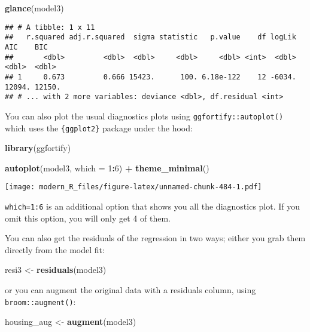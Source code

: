 \documentclass[
]{article}
\newenvironment{Shaded}{\begin{snugshade}}{\end{snugshade}}
\newcommand{\DataTypeTok}[1]{\textcolor[rgb]{0.13,0.29,0.53}{#1}}
\newcommand{\DecValTok}[1]{\textcolor[rgb]{0.00,0.00,0.81}{#1}}
\newcommand{\KeywordTok}[1]{\textcolor[rgb]{0.13,0.29,0.53}{\textbf{#1}}}
\newcommand{\NormalTok}[1]{#1}
\newcommand{\OperatorTok}[1]{\textcolor[rgb]{0.81,0.36,0.00}{\textbf{#1}}}
\newcommand{\StringTok}[1]{\textcolor[rgb]{0.31,0.60,0.02}{#1}}
\begin{document}
\begin{Shaded}
\begin{Highlighting}[]
\KeywordTok{glance}\NormalTok{(model3)}
\end{Highlighting}
\end{Shaded}

\begin{verbatim}
## # A tibble: 1 x 11
##   r.squared adj.r.squared  sigma statistic   p.value    df logLik    AIC    BIC
##       <dbl>         <dbl>  <dbl>     <dbl>     <dbl> <int>  <dbl>  <dbl>  <dbl>
## 1     0.673         0.666 15423.      100. 6.18e-122    12 -6034. 12094. 12150.
## # ... with 2 more variables: deviance <dbl>, df.residual <int>
\end{verbatim}

You can also plot the usual diagnostics plots using \texttt{ggfortify::autoplot()} which uses the
\texttt{\{ggplot2\}} package under the hood:

\begin{Shaded}
\begin{Highlighting}[]
\KeywordTok{library}\NormalTok{(ggfortify)}

\KeywordTok{autoplot}\NormalTok{(model3, }\DataTypeTok{which =} \DecValTok{1}\OperatorTok{:}\DecValTok{6}\NormalTok{) }\OperatorTok{+}\StringTok{ }\KeywordTok{theme\_minimal}\NormalTok{()}
\end{Highlighting}
\end{Shaded}

\texttt{[image: modern\_R\_files/figure-latex/unnamed-chunk-484-1.pdf]}

\texttt{which=1:6} is an additional option that shows you all the diagnostics plot. If you omit this
option, you will only get 4 of them.

You can also get the residuals of the regression in two ways; either you grab them directly from
the model fit:

\begin{Shaded}
\begin{Highlighting}[]
\NormalTok{resi3 \textless{}{-}}\StringTok{ }\KeywordTok{residuals}\NormalTok{(model3)}
\end{Highlighting}
\end{Shaded}

or you can augment the original data with a residuals column, using \texttt{broom::augment()}:

\begin{Shaded}
\begin{Highlighting}[]
\NormalTok{housing\_aug \textless{}{-}}\StringTok{ }\KeywordTok{augment}\NormalTok{(model3)}
\end{Highlighting}
\end{Shaded}
\end{document}
